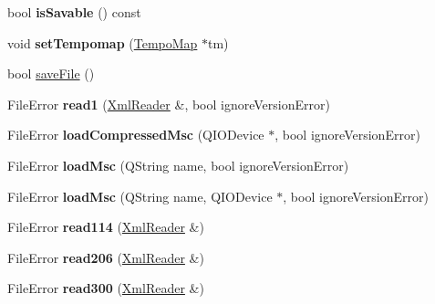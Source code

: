 \begin{DoxyCompactItemize}
\mbox{\label{class_ms_1_1_master_score_a7e232ed775418d00f8bbe8030ad4493c}} 
bool {\bfseries is\+Savable} () const
\item 
\mbox{\label{class_ms_1_1_master_score_a12e3d40287fd79dcdb451e2b5894a622}} 
void {\bfseries set\+Tempomap} (\hyperlink{class_ms_1_1_tempo_map}{Tempo\+Map} $\ast$tm)
\item 
bool \hyperlink{class_ms_1_1_master_score_abaf1b1c61767ee8e0c72b825d97749d8}{save\+File} ()
\item 
\mbox{\label{class_ms_1_1_master_score_ac25361caa754739d05cdd19c81a56322}} 
File\+Error {\bfseries read1} (\hyperlink{class_ms_1_1_xml_reader}{Xml\+Reader} \&, bool ignore\+Version\+Error)
\item 
\mbox{\label{class_ms_1_1_master_score_ad47469d3efb5612b51ff2236967223f9}} 
File\+Error {\bfseries load\+Compressed\+Msc} (Q\+I\+O\+Device $\ast$, bool ignore\+Version\+Error)
\item 
\mbox{\label{class_ms_1_1_master_score_aea07b01a2748995284f2fe295141b746}} 
File\+Error {\bfseries load\+Msc} (Q\+String name, bool ignore\+Version\+Error)
\item 
\mbox{\label{class_ms_1_1_master_score_aae21e7faa85980746d1fc3a22e1d8b0a}} 
File\+Error {\bfseries load\+Msc} (Q\+String name, Q\+I\+O\+Device $\ast$, bool ignore\+Version\+Error)
\item 
\mbox{\label{class_ms_1_1_master_score_a9d90ffc73f285cd3b42b4b87a78e15e1}} 
File\+Error {\bfseries read114} (\hyperlink{class_ms_1_1_xml_reader}{Xml\+Reader} \&)
\item 
\mbox{\label{class_ms_1_1_master_score_a626699cdfb15df7b5d2efdbcd0ba98be}} 
File\+Error {\bfseries read206} (\hyperlink{class_ms_1_1_xml_reader}{Xml\+Reader} \&)
\item 
\mbox{\label{class_ms_1_1_master_score_aa9f21a1086bca6e582a15c8bb4167592}} 
File\+Error {\bfseries read300} (\hyperlink{class_ms_1_1_xml_reader}{Xml\+Reader} \&)

\end{DoxyCompactItemize}
